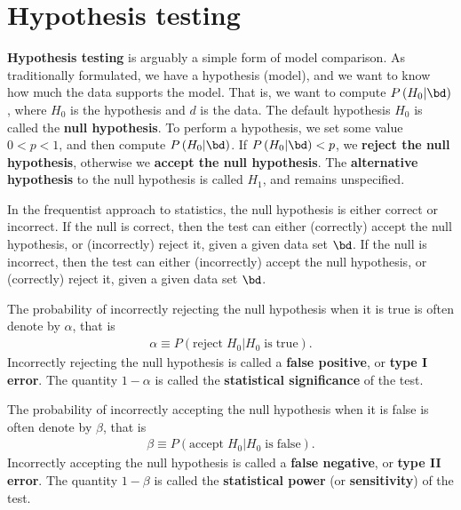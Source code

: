 \section{Hypothesis testing}

\textbf{Hypothesis testing} is arguably a simple form of model comparison.
As traditionally formulated, we have a hypothesis (model), and we want to know how much the data supports the model.
That is, we want to compute $P\left(H_0|\bd\right)$, where $H_0$ is the hypothesis and $d$ is the data.
The default hypothesis $H_0$ is called the \textbf{null hypothesis}.
To perform a hypothesis, we set some value $0<p<1$, and then compute $P\left(H_0|\bd\right)$.
If $P\left(H_0|\bd\right)<p$, we \textbf{reject the null hypothesis}, otherwise we \textbf{accept the null hypothesis}.
The \textbf{alternative hypothesis} to the null hypothesis is called $H_1$, and remains unspecified.

In the frequentist approach to statistics, the null hypothesis is either correct or incorrect.
If the null is correct, then the test can either (correctly) accept the null hypothesis, or (incorrectly) reject it, given a given data set $\bd$.
If the null is incorrect, then the test can either (incorrectly) accept the null hypothesis, or (correctly) reject it, given a given data set $\bd$.

The probability of incorrectly rejecting the null hypothesis when it is true is often denote by $\alpha$, that is
\begin{align}
    \label{eq:frequentist-def-alpha}
    \alpha
    \equiv
    P\left(\mathrm{reject}\;H_0|H_0\;\mathrm{is\;true}\right)
    .
\end{align}
Incorrectly rejecting the null hypothesis is called a \textbf{false positive}, or \textbf{type I error}.
The quantity $1-\alpha$ is called the \textbf{statistical significance} of the test.

The probability of incorrectly accepting the null hypothesis when it is false is often denote by $\beta$, that is
\begin{align}
    \label{eq:frequentist-def-beta}
    \beta
    \equiv
    P\left(\mathrm{accept}\;H_0|H_0\;\mathrm{is\;false}\right)
    .
\end{align}
Incorrectly accepting the null hypothesis is called a \textbf{false negative}, or \textbf{type II error}.
The quantity $1-\beta$ is called the \textbf{statistical power} (or \textbf{sensitivity}) of the test.


